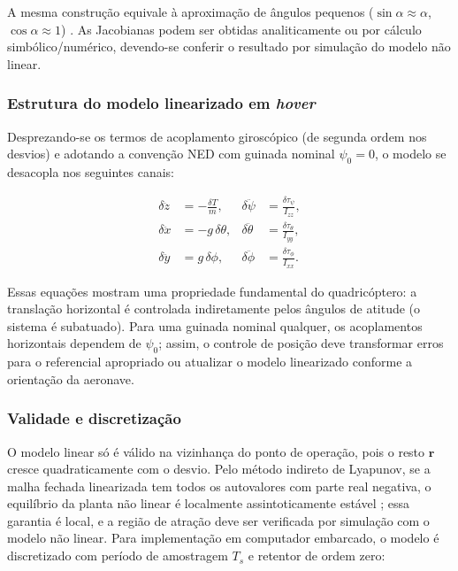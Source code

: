 \noindent A mesma construção equivale à aproximação de ângulos pequenos ($\sin\alpha \approx \alpha$, $\cos\alpha \approx 1$) \cite{quan2017}. As Jacobianas podem ser obtidas analiticamente ou por cálculo simbólico/numérico, devendo-se conferir o resultado por simulação do modelo não linear.

\subsubsection{Estrutura do modelo linearizado em \textit{hover}}

Desprezando-se os termos de acoplamento giroscópico (de segunda ordem nos desvios) e adotando a convenção NED com guinada nominal $\psi_0=0$, o modelo se desacopla nos seguintes canais:

\begin{align}
\delta\ddot{z} &= -\frac{\delta T}{m}, &
\delta\ddot{\psi} &= \frac{\delta\tau_\psi}{I_{zz}}, \label{eq:canal_zpsi}\\
\delta\ddot{x} &= -g\,\delta\theta, &
\delta\ddot{\theta} &= \frac{\delta\tau_\theta}{I_{yy}}, \label{eq:canal_x}\\
\delta\ddot{y} &= g\,\delta\phi, &
\delta\ddot{\phi} &= \frac{\delta\tau_\phi}{I_{xx}}. \label{eq:canal_y}
\end{align}

Essas equações mostram uma propriedade fundamental do quadricóptero: a translação horizontal é controlada indiretamente pelos ângulos de atitude (o sistema é subatuado). Para uma guinada nominal qualquer, os acoplamentos horizontais dependem de $\psi_0$; assim, o controle de posição deve transformar erros para o referencial apropriado ou atualizar o modelo linearizado conforme a orientação da aeronave.

\subsubsection{Validade e discretização}

O modelo linear só é válido na vizinhança do ponto de operação, pois o resto $\mathbf{r}$ cresce quadraticamente com o desvio. Pelo método indireto de Lyapunov, se a malha fechada linearizada tem todos os autovalores com parte real negativa, o equilíbrio da planta não linear é localmente assintoticamente estável \cite{khalil2002}; essa garantia é local, e a região de atração deve ser verificada por simulação com o modelo não linear. Para implementação em computador embarcado, o modelo é discretizado com período de amostragem $T_s$ e retentor de ordem zero:


